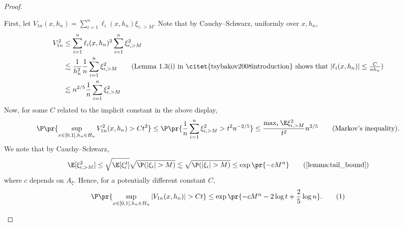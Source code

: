 \documentclass[12pt, reqno]{amsart}
\newcommand\numberthis{\addtocounter{equation}{1}\tag{\theequation}}
\numberwithin{equation}{section}
\begin{document}
\begin{refsection}
\begin{appendices}
\begin{proof}
\begin{enumerate}[wide]
  First, let $V_{1n}(x, h_n) = \sum_{i=1}^n \ell_i(x, h_n) \xi_{i, >M}$. Note that by
  Cauchy--Schwarz, uniformly over $x, h_n$, \begin{align*}
  V_{1n}^2 &\le \sum_{i=1}^n \ell_i(x, h_n)^2 \sum_{i=1}^n \xi_{i, >M}^2 \\
  &\lesssim \frac{1}{h_n^2} \frac{1}{n} \sum_{i=1}^n \xi_{i, >M}^2 \tag{Lemma 1.3(i) in
  \citet{tsybakov2008introduction} shows that $|\ell_i(x,h_n)| \le \frac{C}{nh_n}$} \\
  &\lesssim n^{2/5} \frac{1}{n} \sum_{i=1}^n \xi_{i, >M}^2
  \end{align*}
  Now, for some $C$ related to the implicit constant in the above display, \[
\P\pr{\sup_{x \in [0,1], h_n \in H_n} V_{1n}^2(x,h_n) > C t^2} \le \P\pr{
  \frac{1}{n} \sum_{i=1}^n \xi_{i, >M}^2 > t^2 n^{-2/5}
} \le \frac{\max_{i} \E\xi_{i, >M}^2}{ t^2} n^{2/5} \tag{Markov's inequality}. \]
We note that by Cauchy--Schwarz, \[
\E[\xi_{i, >M}^2] \le \sqrt{\E[\xi_i^4]} \sqrt{\P(|\xi_i| > M)} \lesssim \sqrt{\P
(|\xi_i| > M)} \le \exp\pr{-c M^\alpha} \tag{\cref{lemma:tail_bound}}
\]
where $c$ depends on $A_\xi$.
Hence, for a potentially different constant $C$, \[
\P\pr{\sup_{x \in [0,1], h_n \in H_n} |V_{1n}(x,h_n)| > Ct} \le \exp\pr{-c M^\alpha - 2
\log t +
\frac{2}{5} \log n }. \numberthis \label{eq:llr_large_tail_term}
\]




\end{enumerate}
\end{proof}
\end{appendices}
\end{refsection}
\end{document}
